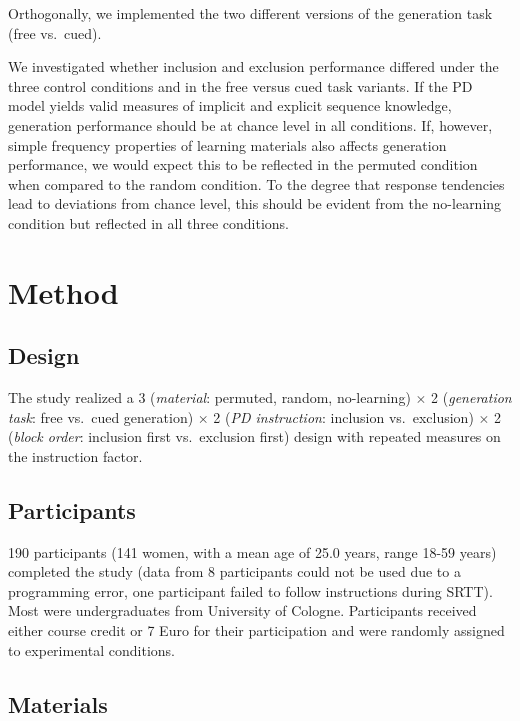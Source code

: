 \documentclass[
  english,
  man]{apa6}
\begin{document}
Orthogonally, we implemented the two different versions of the generation task (free vs.~cued).

We investigated whether inclusion and exclusion performance differed under the three control conditions and in the free versus cued task variants.
If the PD model yields valid measures of implicit and explicit sequence knowledge, generation performance should be at chance level in all conditions.
If, however, simple frequency properties of learning materials also affects generation performance, we would expect this to be reflected in the permuted condition when compared to the random condition.
To the degree that response tendencies lead to deviations from chance level, this should be evident from the no-learning condition but reflected in all three conditions.

\hypertarget{method}{%
\section{Method}\label{method}}

\hypertarget{design}{%
\subsection{Design}\label{design}}

The study realized a 3 (\emph{material}: permuted, random, no-learning) \(\times\) 2 (\emph{generation task}: free vs.~cued generation) \(\times\) 2 (\emph{PD instruction}: inclusion vs.~exclusion) \(\times\) 2 (\emph{block order}: inclusion first vs.~exclusion first) design with repeated measures on the instruction factor.

\hypertarget{participants}{%
\subsection{Participants}\label{participants}}

190 participants (141 women, with a mean age of 25.0 years, range 18-59 years) completed the study (data from 8 participants could not be used due to a programming error, one participant failed to follow instructions during SRTT).
Most were undergraduates from University of Cologne.
Participants received either course credit or 7 Euro for their participation and were randomly assigned to experimental conditions.

\hypertarget{materials}{%
\subsection{Materials}\label{materials}}
\end{document}
